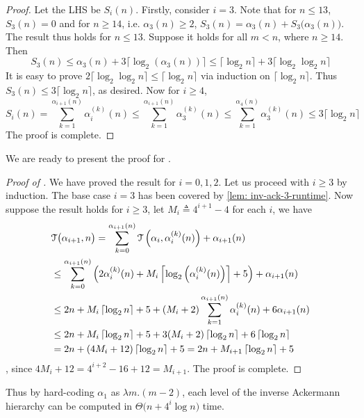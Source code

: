 \begin{proof}
	Let the LHS be $S_i(n)$. Firstly, consider $i = 3$. Note that for $n\le 13$, $S_3(n) = 0$ and for $n\ge 14$, i.e. $\alpha_3(n)\ge 2$, $S_3(n) = \alpha_3(n) + S_3\big(\alpha_3(n)\big)$. The result thus holds for $n\le 13$. Suppose it holds for all $m < n$, where $n\ge 14$. Then
	\begin{equation*}
	S_3(n) \le \alpha_3(n) + 3\big\lceil \log_2(\alpha_3(n)) \big\rceil \le \big\lceil \log_2n \big\rceil + 3\big\lceil \log_2\log_2n \big\rceil
	\end{equation*}
	It is easy to prove $2\big\lceil \log_2\log_2n \big\rceil \le \big\lceil \log_2n \big\rceil$ via induction on $\big\lceil \log_2n \big\rceil$. Thus $S_3(n)\le 3\big\lceil \log_2n \big\rceil$, as desired. Now for $i \ge 4$,
	\begin{equation*}
	S_i(n) = \sum_{k=1}^{\alpha_{i+1}(n)} \alpha_i^{(k)}(n) \le
	\sum_{k=1}^{\alpha_{i+1}(n)} \alpha_3^{(k)}(n) \le
	\sum_{k=1}^{\alpha_{4}(n)} \alpha_3^{(k)}(n) \le 3\big\lceil \log_2n \big\rceil
	\end{equation*}
	The proof is complete.	
\end{proof}
We are ready to present the proof for .
\begin{proof}[Proof of ]
	We have proved the result for $i = 0, 1, 2$. Let us proceed with $i\ge 3$ by induction. The base case $i = 3$ has been covered by \cref{lem: inv-ack-3-runtime}. Now suppose the result holds for $i\ge 3$, let $M_i\triangleq 4^{i+1}-4$ for each $i$, we have
	\begin{equation*}
	\begin{aligned}
	& \mathcal{T}\big(\alpha_{i+1}, n\big) = \sum_{k=0}^{\alpha_{i+1}(n)} \mathcal{T}\left(\alpha_i, \alpha_i^{(k)}(n)\right) + \alpha_{i+1}(n) \\
	& \le \sum_{k=0}^{\alpha_{i+1}(n)}\left(2\alpha_i^{(k)}(n) + M_i\left\lceil\log_2\left(\alpha_i^{(k)}(n)\right)\right\rceil + 5 \right) + \alpha_{i+1}(n) \\
	& \le 2n + M_i\left\lceil\log_2n\right\rceil + 5 + (M_i+2)\sum_{k=1}^{\alpha_{i+1}(n)}\alpha_i^{(k)}(n) + 6\alpha_{i+1}(n) \\
	& \le 2n + M_i\left\lceil\log_2n\right\rceil + 5 +
	3(M_i + 2)\left\lceil\log_2n\right\rceil + 6\left\lceil\log_2n\right\rceil \\
	& = 2n + (4M_i + 12)\left\lceil\log_2n\right\rceil + 5 = 2n + M_{i+1}\left\lceil\log_2n\right\rceil + 5
	\end{aligned}
	\end{equation*}
	, since $4M_i + 12 = 4^{i+2} - 16 + 12 = M_{i+1}$. The proof is complete.
\end{proof}
Thus by hard-coding $\alpha_1$ as $\lambda m.(m-2)$, each level of the inverse Ackermann hierarchy can be computed in $\Theta\big(n + 4^i\log n\big)$ time.

